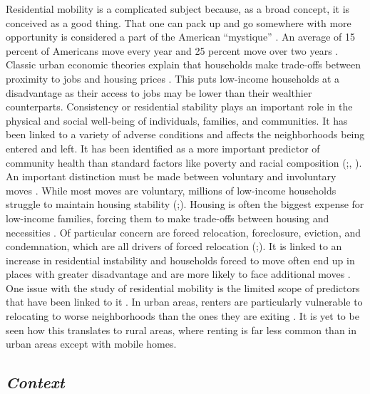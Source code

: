 Residential mobility is a complicated subject because, as a broad concept, it is conceived as a good thing. That one can pack up and go somewhere with more opportunity is considered a part of the American “mystique” \citep{molloy_internal_2011}. An average of 15 percent of Americans move every year and 25 percent move over two years \citep{bachmann_ins_2014}. Classic urban economic theories explain that households make trade-offs between proximity to jobs and housing prices \citep{hu_housing_2019}. This puts low-income households at a disadvantage as their access to jobs may be lower than their wealthier counterparts. Consistency or residential stability plays an important role in the physical and social well-being of individuals, families, and communities. It has been linked to a variety of adverse conditions and affects the neighborhoods being entered and left. It has been identified as a more important predictor of community health than standard factors like poverty and racial composition (\citealp{desmond_forced_2015};\citealp{desmond_housing_2016}, \citealp{rauh_housing_2008}). An important distinction must be made between voluntary and involuntary moves \citep{siskar_who_2019}. While most moves are voluntary, millions of low-income households struggle to maintain housing stability (\citealp{phinney_exploring_2013};\citealp{kang_why_2019}). Housing is often the biggest expense for low-income families, forcing them to make trade-offs between housing and necessities \citep{desmond_housing_2015}. Of particular concern are forced relocation, foreclosure, eviction, and condemnation, which are all drivers of forced relocation (\citealp{phinney_exploring_2013};\citealp{siskar_who_2019}). It is linked to an increase in residential instability and households forced to move often end up in places with greater disadvantage and are more likely to face additional moves \citep{desmond_forced_2015}. One issue with the study of residential mobility is the limited scope of predictors that have been linked to it \citep{kang_why_2019}. In urban areas, renters are particularly vulnerable to relocating to worse neighborhoods than the ones they are exiting \citep{desmond_forced_2015}. It is yet to be seen how this translates to rural areas, where renting is far less common than in urban areas except with mobile homes. 

\subsection{\textit{Context}}


